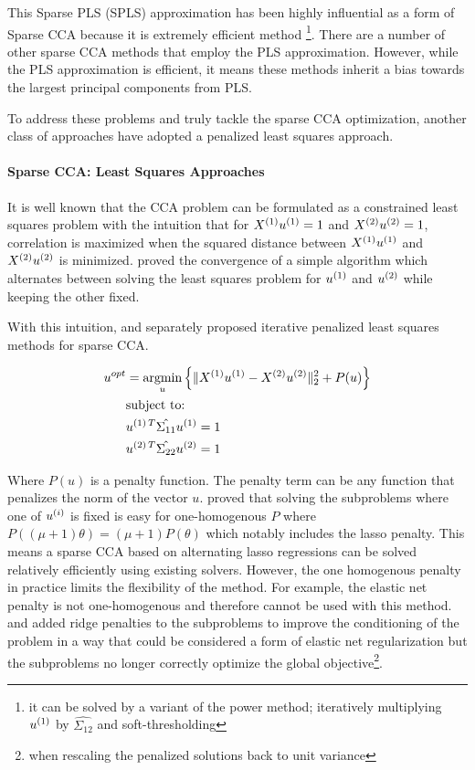 This Sparse PLS (SPLS) approximation has been highly influential as a form of Sparse CCA because it is extremely efficient method \footnote{it can be solved by a variant of the power method; iteratively multiplying $u^{(1)}$ by $\hat{\Sigma_{12}}$ and soft-thresholding}.
There are a number of other sparse CCA methods that employ the PLS approximation\citep{parkhomenko2009sparse, waaijenborg2008quantifying, lindenbaum2021l0}.
However, while the PLS approximation is efficient, it means these methods inherit a bias towards the largest principal components from PLS.

To address these problems and truly tackle the sparse CCA optimization, another class of approaches have adopted a penalized least squares approach.

\paragraph{Sparse CCA: Least Squares Approaches}

It is well known that the CCA problem can be formulated as a constrained least squares problem with the intuition that
for \(X^{(1)} u^{(1)}=1\) and \(X^{(2)} u^{(2)}=1\), correlation is maximized when the squared distance
between \(X^{(1)} u^{(1)}\) and \(X^{(2)} u^{(2)}\) is minimized. \citep{golub1995canonical} proved the
convergence of a simple algorithm which alternates between solving the least squares problem for \(u^{(1)}\) and
\(u^{(2)}\) while keeping the other fixed.

With this intuition, \cite{wilms2015sparse} and \cite{mai2019iterative} separately proposed iterative penalized least
squares methods for sparse CCA\@.

\begin{align}
    \label{eq:mai}
    u^{opt} &= \underset{u}{\mathrm{argmin}} \left\{ \|X^{(1)}u^{(1)} - X^{(2)}u^{(2)}\|_2^2 + P(u) \right\} \\
    &\text{subject to:} \notag \\
    &u^{(1)\,T} \hat{\Sigma_{11}} u^{(1)}=1 \notag \\
    &u^{(2)\,T} \hat{\Sigma_{22}} u^{(2)}=1 \notag
\end{align}

Where \(P(u)\) is a penalty function.
The penalty term can be any function that penalizes the norm of the vector \(u\).
\citep{mai2019iterative} proved that solving the subproblems where one of $u^{(i)}$ is fixed is easy for one-homogenous $P$ where
\( P((\mu + 1)\theta) = (\mu + 1)P(\theta) \) which notably includes the lasso penalty.
This means a sparse CCA based
on alternating lasso regressions can be solved relatively efficiently using existing solvers.
However, the one homogenous penalty in practice limits the flexibility of the method.
For example, the elastic net penalty is not one-homogenous and therefore cannot be used with this method.
\citet{6556581} and \cite{Mullins2021} added ridge penalties to the subproblems to improve the conditioning of the problem in a way that could be considered a form of elastic net regularization but the subproblems no longer correctly optimize the global objective\footnote{when rescaling the penalized solutions back to unit variance}.

